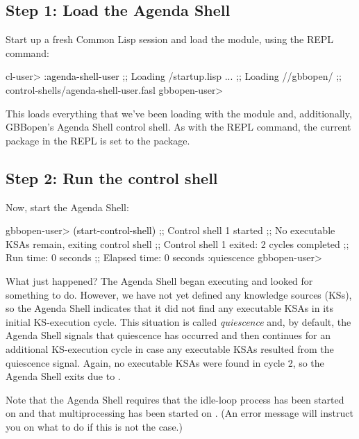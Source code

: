 \documentclass[10pt,twoside,english,pdftex]{article}
\begin{document}
\subsection*{Step 1: Load the Agenda Shell}

Start up a fresh Common Lisp session and load the 
module, using the  REPL command:
%
\W\supp
\begin{example}
\textcolor{darkergray}{%
  cl-user> \textcolor{black}{:agenda-shell-user}
  ;; Loading /startup.lisp
     ...
  ;; Loading //gbbopen/
  ;;            control-shells/agenda-shell-user.fasl
  gbbopen-user>}
\end{example}

This loads everything that we've been loading with the 
module and, additionally, GBBopen's Agenda Shell control shell. As with the
 REPL command, the current package in the REPL is set to
the  package.

\subsection*{Step 2: Run the control shell}

%
%
Now, start the Agenda Shell:
%
\W\supp
\begin{example}
\textcolor{darkergray}{%
  gbbopen-user> \textcolor{black}{(start-control-shell)}
  ;; Control shell 1 started
  ;; No executable KSAs remain, exiting control shell
  ;; Control shell 1 exited: 2 cycles completed
  ;; Run time: 0 seconds
  ;; Elapsed time: 0 seconds
  :quiescence
  gbbopen-user>}
\end{example}

What just happened?  The Agenda Shell began executing and looked for something
to do.  However, we have not yet defined any knowledge sources (KSs), so the
Agenda Shell indicates that it did not find any executable KSAs in its initial
KS-execution cycle.  This situation is called \textit{quiescence} and, by
default, the Agenda Shell signals that quiescence has occurred and then
continues for an additional KS-execution cycle in case any executable KSAs
resulted from the quiescence signal.  Again, no executable KSAs were found in
cycle 2, so the Agenda Shell exits due to .

Note that the Agenda Shell requires that the idle-loop process has been
started on  and that
multiprocessing has been started on
.  (An error message will
instruct you on what to do if this is not the case.)
\end{document}
